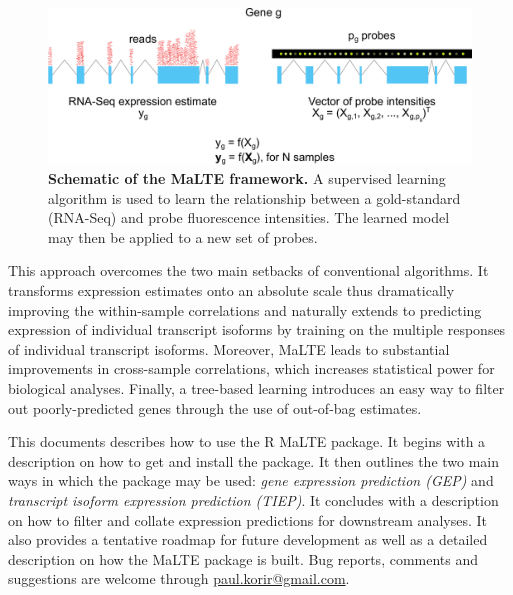 \documentclass[a4paper,12pt]{article}
\begin{document}
\begin{figure}[H]
\centering
\includegraphics[width=\columnwidth]{schematic.pdf}
\caption{\textbf{Schematic of the MaLTE framework.} A supervised learning algorithm is used to learn the relationship between a gold-standard (RNA-Seq) and probe fluorescence intensities. The learned model may then be applied to a new set of probes.}
\label{fig:schematic}
\end{figure}

This approach overcomes the two main setbacks of conventional algorithms. It transforms expression estimates onto an absolute scale thus dramatically improving the within-sample correlations and naturally extends to predicting expression of individual transcript isoforms by training on the multiple responses of individual transcript isoforms. Moreover, \textsf{MaLTE} leads to substantial improvements in cross-sample correlations, which increases statistical power for biological analyses. Finally, a tree-based learning introduces an easy way to filter out poorly-predicted genes through the use of out-of-bag estimates.

This documents describes how to use the \textsf{R} \textsf{MaLTE} package. It begins with a description on how to get and install the package. It then outlines the two main ways in which the package may be used: \textit{gene expression prediction (GEP)} and \textit{transcript isoform expression prediction (TIEP)}. It concludes with a description on how to filter and collate expression predictions for downstream analyses. It also provides a tentative roadmap for future development as well as a detailed description on how the \textsf{MaLTE} package is built. Bug reports, comments and suggestions are welcome through \href{mailto:paul.korir@gmail.com}{paul.korir@gmail.com}.
\end{document}
